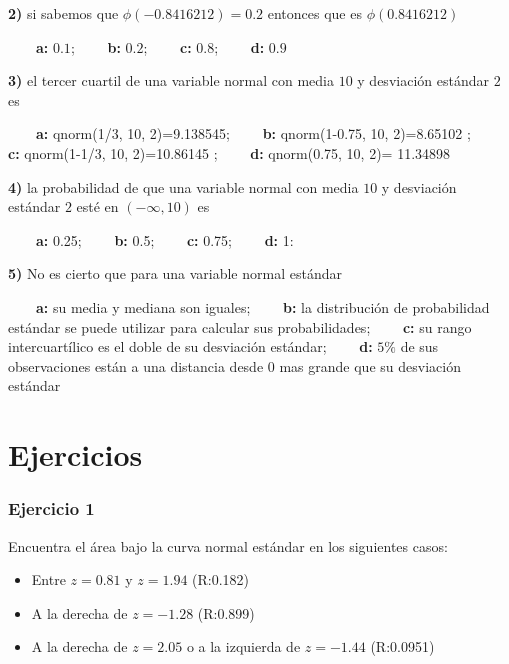 \documentclass[
]{book}
\providecommand{\tightlist}{%
  \setlength{\itemsep}{0pt}\setlength{\parskip}{0pt}}
\begin{document}
\textbf{2)} si sabemos que \(\phi(-0.8416212)=0.2\) entonces que es \(\phi(0.8416212)\)

\textbf{\(\qquad\)a:} \(0.1\);
\textbf{\(\qquad\)b:} \(0.2\);
\textbf{\(\qquad\)c:} \(0.8\);
\textbf{\(\qquad\)d:} \(0.9\)

\textbf{3)} el tercer cuartil de una variable normal con media \(10\) y desviación estándar \(2\) es

\textbf{\(\qquad\)a:} qnorm(1/3, 10, 2)=9.138545;
\textbf{\(\qquad\)b:} qnorm(1-0.75, 10, 2)=8.65102 ;
\textbf{\(\qquad\)c:} qnorm(1-1/3, 10, 2)=10.86145 ;
\textbf{\(\qquad\)d:} qnorm(0.75, 10, 2)= 11.34898

\textbf{4)} la probabilidad de que una variable normal con media \(10\) y desviación estándar \(2\) esté en \((-\infty,10)\) es

\textbf{\(\qquad\)a:} 0.25;
\textbf{\(\qquad\)b:} 0.5;
\textbf{\(\qquad\)c:} 0.75;
\textbf{\(\qquad\)d:} 1:

\textbf{5)} No es cierto que para una variable normal estándar

\textbf{\(\qquad\)a:} su media y mediana son iguales; \textbf{\(\qquad\)b:} la distribución de probabilidad estándar se puede utilizar para calcular sus probabilidades; \textbf{\(\qquad\)c:} su rango intercuartílico es el doble de su desviación estándar; \textbf{\(\qquad\)d:} \(5\%\) de sus observaciones están a una distancia desde \(0\) mas grande que su desviación estándar

\hypertarget{ejercicios-7}{%
\section{Ejercicios}\label{ejercicios-7}}

\hypertarget{ejercicio-1-6}{%
\subsubsection{Ejercicio 1}\label{ejercicio-1-6}}

Encuentra el área bajo la curva normal estándar en los siguientes casos:

\begin{itemize}
\tightlist
\item
  Entre \(z=0.81\) y \(z=1.94\) (R:0.182)
\item
  A la derecha de \(z=-1.28\) (R:0.899)
\item
  A la derecha de \(z=2.05\) o a la izquierda de \(z=-1.44\) (R:0.0951)
\end{itemize}
\end{document}
